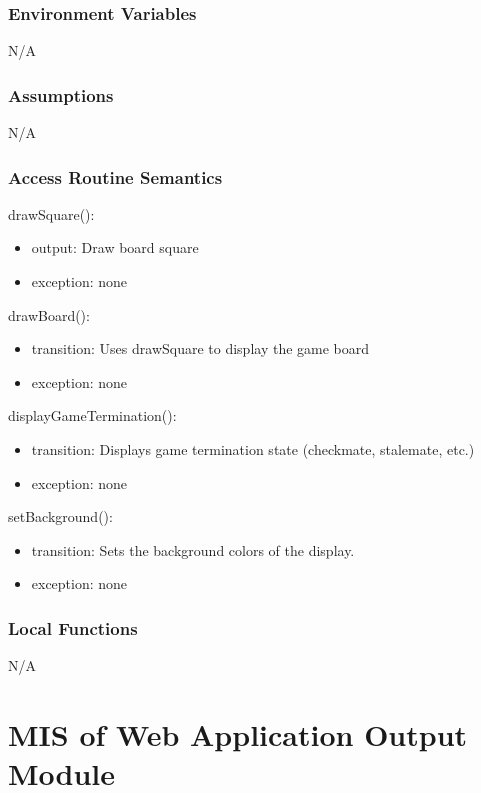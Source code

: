 \documentclass[12pt, titlepage]{article}
\begin{document}
    \subsubsection{Environment Variables}
    N/A

    \subsubsection{Assumptions}
    N/A

    \subsubsection{Access Routine Semantics}
        \noindent drawSquare():
        \begin{itemize}
            \item output: Draw board square
            \item exception: none
        \end{itemize}

        \noindent drawBoard():
        \begin{itemize}
            \item transition: Uses drawSquare to display the game board
            \item exception: none
        \end{itemize}

        \noindent displayGameTermination():
        \begin{itemize}
            \item transition: Displays game termination state (checkmate, stalemate, etc.)
            \item exception: none
        \end{itemize}

        \noindent setBackground():
        \begin{itemize}
            \item transition: Sets the background colors of the display.
            \item exception: none
        \end{itemize}

    \subsubsection{Local Functions}
    N/A

    \newpage

\section{MIS of Web Application Output Module} \label{mOutput}
\end{document}
